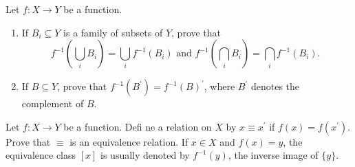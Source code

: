 \begin{questions}
\begin{solution}
    
\end{solution}


\question
    Let \(f: X \rightarrow Y\) be a function.
    \begin{enumerate}[label=(\alph*)]
        \item If \(B_i \subseteq Y\) is a family of subsets of \(Y\), prove that
\[
f^{-1}\left(\bigcup_i B_i\right)=\bigcup_i f^{-1}\left(B_i\right) \text { and } f^{-1}\left(\bigcap_i B_i\right)=\bigcap_i f^{-1}\left(B_i\right) \text {. }
\]
        \item If \(B \subseteq Y\), prove that \(f^{-1}\left(B^{\prime}\right)=f^{-1}(B)^{\prime}\), where \(B^{\prime}\) denotes the complement of \(B\).
    \end{enumerate}



\begin{solution}
    
\end{solution}


\question
    Let \(f: X \rightarrow Y\) be a function. Defi ne a relation on \(X\) by \(x \equiv x^{\prime}\) if \(f(x)=f\left(x^{\prime}\right)\). Prove that \(\equiv\) is an equivalence relation. If \(x \in X\) and \(f(x)=y\), the equivalence class \([x]\) is usually denoted by \(f^{-1}(y)\), the inverse image of \(\{y\}\).

\begin{solution}
    
\end{solution}
\end{questions}